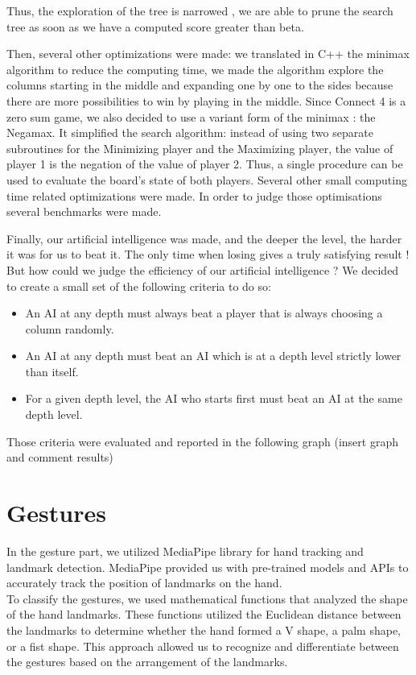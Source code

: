 \documentclass[12pt, a4paper, oneside]{report}
\begin{document}
	Thus, the exploration of the tree is narrowed , we are able to prune the search tree as soon as we have a computed score greater than beta.

	Then, several other optimizations were made: we translated in C++ the minimax algorithm to reduce the computing time, we made the algorithm explore the columns starting in the middle and expanding one by one to the sides because there are more possibilities to win by playing in the middle. 
	Since Connect 4 is a zero sum game, we also decided to use a variant form of the minimax : the Negamax. It simplified the search algorithm: instead of using two separate subroutines for the Minimizing player and the Maximizing player, the value of player 1 is the negation of the value of player 2. Thus, a single procedure can be used to evaluate the board’s state of both players.
	Several other small computing time related optimizations were made. In order to judge those optimisations several benchmarks were made.


	Finally, our artificial intelligence was made, and the deeper the level, the harder it was for us to beat it. The only time when losing gives a truly satisfying result ! But how could we judge the efficiency of our artificial intelligence ? We decided to create a small set of the following criteria to do so:
	\begin{itemize}
		\item An AI at any depth must always beat a player that is always choosing a column randomly.
		\item An AI at any depth must beat an AI which is at a depth level strictly lower than itself.
		\item For a given depth level, the AI who starts first must beat an AI at the same depth level.
	\end{itemize}

	Those criteria were evaluated and reported in the following graph (insert graph and comment results) \\
 \newpage

	\section{Gestures}
In the gesture part, we utilized MediaPipe library for hand tracking and landmark detection. MediaPipe provided us with pre-trained models and APIs to accurately track the position of landmarks on the hand.\\

To classify the gestures, we used mathematical functions that analyzed the shape of the hand landmarks. These functions utilized the Euclidean distance between the landmarks to determine whether the hand formed a V shape, a palm shape, or a fist shape. This approach allowed us to recognize and differentiate between the gestures based on the arrangement of the landmarks.\\
\end{document}
